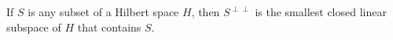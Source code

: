 If $S$ is any subset of a Hilbert space $H$, then $S^{\perp\perp}$ is the smallest closed linear subspace of $H$ that contains $S$.
